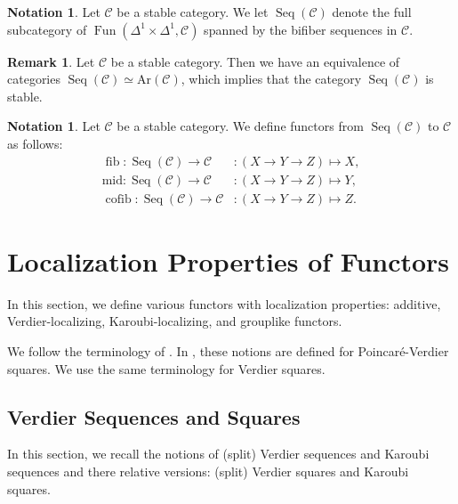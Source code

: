 \documentclass[a4paper,dvipdfmx,11pt,reqno]{amsart}
\DeclareMathOperator{\fib}{fib}
\DeclareMathOperator{\cofib}{cofib}
\renewcommand{\mid}{\mathrm{mid}}
\DeclareMathOperator{\Fun}{Fun}
\newcommand{\C}{\mathcal{C}}
\DeclareMathOperator{\Seq}{Seq}
\newcommand{\Ar}{\mathrm{Ar}}
\theoremstyle{definition}
\newtheorem{notation}[theorem]{Notation}
\newtheorem{remark}[theorem]{Remark}
\begin{document}
\begin{notation} \label{Ber.p49}
  Let $\C$ be a stable category.
  We let $\Seq(\C)$ denote the full subcategory of $\Fun(\Delta^1 \times \Delta^1,\C)$ spanned by the bifiber sequences in $\C$.
\end{notation}

\begin{remark}
  Let $\C$ be a stable category.
  Then we have an equivalence of categories $\Seq(\C) \simeq \Ar(\C)$, which implies that the category $\Seq(\C)$ is stable.
\end{remark}

\begin{notation}
  Let $\C$ be a stable category.
  We define functors from $\Seq(\C)$ to $\C$ as follows:
  \begin{align*}
    \fib   : \Seq(\C) \to \C &: (X \to Y \to Z) \mapsto X, \\
    \mid   : \Seq(\C) \to \C &: (X \to Y \to Z) \mapsto Y, \\
    \cofib : \Seq(\C) \to \C &: (X \to Y \to Z) \mapsto Z.
  \end{align*}
\end{notation}


\section{Localization Properties of Functors} \label{sec.localization_properties}

In this section, we define various functors with localization properties: 
additive, Verdier-localizing, Karoubi-localizing, and grouplike functors.

We follow the terminology of \cite{CDH23}.
In \cite{CDH23}, these notions are defined for Poincar\'{e}-Verdier squares. 
We use the same terminology for Verdier squares.

\subsection{Verdier Sequences and Squares}

In this section, we recall the notions of (split) Verdier sequences and Karoubi sequences and there relative versions: (split) Verdier squares and Karoubi squares.
\end{document}

